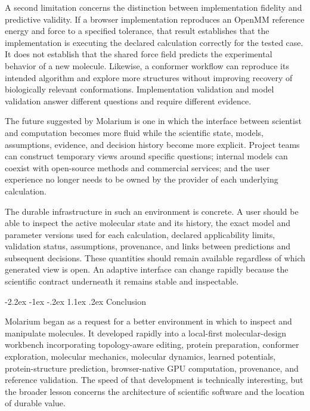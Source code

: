 \documentclass[11pt]{article}
\makeatletter
\renewcommand\section{\@startsection{section}{1}{\z@}%
  {-2.2ex \@plus -1ex \@minus -.2ex}%
  {1.1ex \@plus .2ex}%
  {\normalfont\Large\bfseries\color{molblue}}}
\makeatother
\begin{document}
A second limitation concerns the distinction between implementation fidelity and predictive validity. If a browser implementation reproduces an OpenMM reference energy and force to a specified tolerance, that result establishes that the implementation is executing the declared calculation correctly for the tested case. It does not establish that the shared force field predicts the experimental behavior of a new molecule. Likewise, a conformer workflow can reproduce its intended algorithm and explore more structures without improving recovery of biologically relevant conformations. Implementation validation and model validation answer different questions and require different evidence.

The future suggested by Molarium is one in which the interface between scientist and computation becomes more fluid while the scientific state, models, assumptions, evidence, and decision history become more explicit. Project teams can construct temporary views around specific questions; internal models can coexist with open-source methods and commercial services; and the user experience no longer needs to be owned by the provider of each underlying calculation.

The durable infrastructure in such an environment is concrete. A user should be able to inspect the active molecular state and its history, the exact model and parameter versions used for each calculation, declared applicability limits, validation status, assumptions, provenance, and links between predictions and subsequent decisions. These quantities should remain available regardless of which generated view is open. An adaptive interface can change rapidly because the scientific contract underneath it remains stable and inspectable.

\section{Conclusion}

Molarium began as a request for a better environment in which to inspect and manipulate molecules. It developed rapidly into a local-first molecular-design workbench incorporating topology-aware editing, protein preparation, conformer exploration, molecular mechanics, molecular dynamics, learned potentials, protein-structure prediction, browser-native GPU computation, provenance, and reference validation. The speed of that development is technically interesting, but the broader lesson concerns the architecture of scientific software and the location of durable value.
\end{document}
